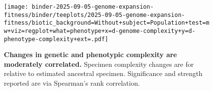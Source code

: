 \begin{figure}
\centering
\texttt{[image: binder-2025-09-05-genome-expansion-fitness/binder/teeplots/2025-09-05-genome-expansion-fitness/biotic\_background=Without+subject=Population+test=mw+viz=regplot+what=phenotype+x=d-genome-complexity+y=d-phenotype-complexity+ext=.pdf]}
\caption{%
\textbf{Changes in genetic and phenotypic complexity are moderately correlated.}
Specimen complexity changes are for relative to estimated ancestral specimen.
Significance and strength reported are via Spearman's rank correlation.
}
\label{fig:gpcomplex-correlation}
\end{figure}
